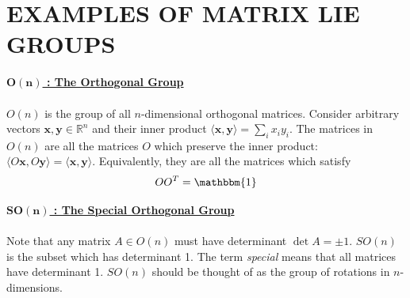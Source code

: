 \documentclass[9 pt]{report}
\def\*#1{\boldsymbol{#1}}
\begin{document}
\newpage




{\centering
\section*{EXAMPLES OF MATRIX LIE GROUPS}}
\begin{tcolorbox}
\noindent\underline{\textbf{$\*{O(n)}$ : The Orthogonal Group}}
\\
\\
$O(n)$ is the group of all $n$-dimensional orthogonal matrices. Consider arbitrary vectors $\*x ,\*y \in\mathbb{R}^n$ and their inner product $\langle\*x, \*y\rangle = \sum_i x_iy_i$. The matrices in $O(n)$ are all the matrices $O$ which preserve the inner product: $\langle O\*x, O\*y\rangle = \langle \*x,\*y\rangle$. Equivalently, they are all the matrices which satisfy
$$ O O^T = \mathbbm{1} $$
\end{tcolorbox}

\begin{tcolorbox}
\underline{\textbf{$ \*{SO(n)} $ : The Special Orthogonal Group}}
\\
\\
Note that any matrix $A\in O(n)$ must have determinant $\det A = \pm1$. $SO(n)$ is the subset which has determinant 1. The term \emph{special} means that all matrices have determinant 1. $SO(n)$ should be thought of as the group of rotations in $n$-dimensions.
\end{tcolorbox}
\end{document}

